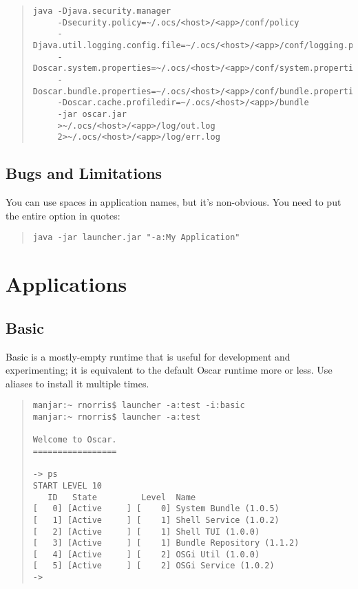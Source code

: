 \documentclass{report}
\begin{document}
\begin{quote}\begin{scriptsize}\begin{verbatim}    
java -Djava.security.manager
     -Dsecurity.policy=~/.ocs/<host>/<app>/conf/policy
     -Djava.util.logging.config.file=~/.ocs/<host>/<app>/conf/logging.properties
     -Doscar.system.properties=~/.ocs/<host>/<app>/conf/system.properties
     -Doscar.bundle.properties=~/.ocs/<host>/<app>/conf/bundle.properties 
     -Doscar.cache.profiledir=~/.ocs/<host>/<app>/bundle 
     -jar oscar.jar
     >~/.ocs/<host>/<app>/log/out.log 
     2>~/.ocs/<host>/<app>/log/err.log
\end{verbatim}\end{scriptsize}\end{quote}
             
\subsection{Bugs and Limitations}
    You can use spaces in application names, but it's non-obvious. You need
    to put the entire option in quotes:
    
\begin{quote}\begin{scriptsize}\begin{verbatim}    
java -jar launcher.jar "-a:My Application"
\end{verbatim}\end{scriptsize}\end{quote}



\section{Applications}

\subsection{Basic}
Basic is a mostly-empty runtime that is useful for development and experimenting;
it is equivalent to the default Oscar runtime more or less. Use aliases to
install it multiple times.

\begin{quote}\begin{scriptsize}\begin{verbatim}    
manjar:~ rnorris$ launcher -a:test -i:basic  
manjar:~ rnorris$ launcher -a:test   

Welcome to Oscar.
=================

-> ps
START LEVEL 10
   ID   State         Level  Name
[   0] [Active     ] [    0] System Bundle (1.0.5)
[   1] [Active     ] [    1] Shell Service (1.0.2)
[   2] [Active     ] [    1] Shell TUI (1.0.0)
[   3] [Active     ] [    1] Bundle Repository (1.1.2)
[   4] [Active     ] [    2] OSGi Util (1.0.0)
[   5] [Active     ] [    2] OSGi Service (1.0.2)
-> 
\end{verbatim}\end{scriptsize}\end{quote}
\end{document}
